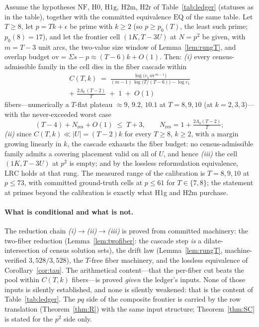 \begin{theorem}\label{thm:SC}
Assume the hypotheses $\mathrm{NF}$, $\mathrm{H0}$, $\mathrm{H1g}$,
$\mathrm{H2m}$, $\mathrm{H2r}$ of Table~\ref{tab:ledger} (statuses as in
the table), together with the committed equivalence $\mathrm{EQ}$ of the
same table. Let $T\ge 8$, let $p=Tk+\epsilon$ be prime with $k\ge 2$
(so $p\ge p_0(T)$, the least such prime; $p_0(8)=17$), and let the
frontier cell $(1K,T{-}3U)$ at $N=p^2$ be given, with $m=T-3$ unit
arcs, the two-value size window of Lemma~\ref{lem:rungT}, and overlap
budget $\mathrm{ov}=\Sigma s-p\approx(T-6)k+O(1)$. Then:
\smallskip
\emph{(i)} every census-admissible family in the cell dies in the fiber
cascade within
\begin{multline*}
C(T,k)\;=\;
\frac{\log\!\bigl(c_1\,\mathrm{ov}^{\,m-1}\bigr)}
     {(m-1)\,\log\!\bigl(T/(T-6)\bigr)-\log c_1}\\
+\;\frac{2\Lambda_0\,(T-2)}{T}\;+\;1\;+\;O(1)
\end{multline*}
fibers---numerically a $T$-flat plateau $\approx 9$, $9.2$, $10.1$ at
$T=8,9,10$ (at $k=2,3,3$)---with the never-exceeded worst case
\[
(T-4)+N_{\mathrm{res}}+O(1)\;\le\;T+3,
\qquad
N_{\mathrm{res}}=1+\tfrac{2\Lambda_0(T-2)}{T};
\]
\smallskip
\emph{(ii)} since $C(T,k)\ll|U|=(T-2)k$ for every $T\ge 8$, $k\ge 2$,
with a margin growing linearly in $k$, the cascade exhausts the fiber
budget: no census-admissible family admits a covering placement valid on
all of $U$, and hence
\smallskip
\emph{(iii)} the cell $(1K,T{-}3U)$ at $p^2$ is empty; and by the
lossless reformulation equivalence, $\mathrm{LRC}$ holds at that rung.
The measured range of the calibration is $T=8,9,10$ at $p\le 73$, with
committed ground-truth cells at $p\le 61$ for $T\in\{7,8\}$; the
statement at primes beyond the calibration is exactly what H1g and H2m
purchase.
\end{theorem}

\paragraph{What is conditional and what is not.}
The reduction chain \emph{(i)}$\to$\emph{(ii)}$\to$\emph{(iii)} is
proved from committed machinery: the two-fiber reduction
(Lemma~\ref{lem:twofiber}: the cascade step \emph{is} a
dilate-intersection of census solution sets), the drift law
(Lemma~\ref{lem:rungT}, machine-verified $3{,}528/3{,}528$), the
$T$-free fiber machinery, and the lossless equivalence of
Corollary~\ref{cor:tau}. The arithmetical content---that the per-fiber
cut beats the pool within $C(T,k)$ fibers---is proved \emph{given} the
ledger's inputs. None of those inputs is silently established, and none
is silently weakened: that is the content of Table~\ref{tab:ledger}. The
$pq$ side of the composite frontier is carried by the row translation
(Theorem~\ref{thm:R}) with the same input structure; Theorem~\ref{thm:SC}
is stated for the $p^2$ side only.

